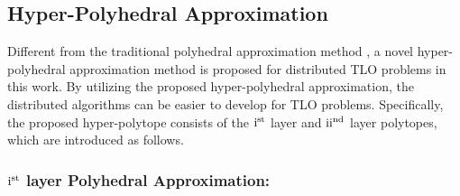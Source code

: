 \documentclass[letterpaper]{article} %
\begin{document}
\subsection{Hyper-Polyhedral Approximation}
Different from the traditional polyhedral approximation method \cite{bertsekas2015convex,franc2011cutting,burger2013polyhedral}, a novel hyper-polyhedral approximation method is proposed for distributed TLO problems in this work. By utilizing the proposed hyper-polyhedral approximation,
the distributed algorithms can be easier to develop for TLO problems. Specifically, the proposed hyper-polytope consists of the ${\rm{\uppercase\expandafter{\romannumeral1}}}^{\rm{st}}$ layer and ${\rm{\uppercase\expandafter{\romannumeral2}}}^{\rm{nd}}$  layer polytopes, which are introduced as follows.


\subsubsection{${\rm{\uppercase\expandafter{\romannumeral1}}}^{\rm{st}}$ layer Polyhedral Approximation:}
\end{document}
